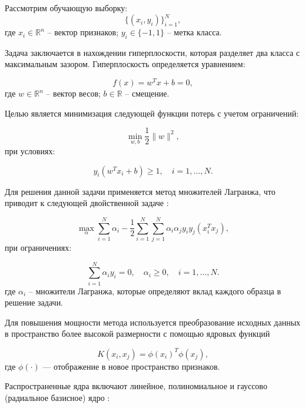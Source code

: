 Рассмотрим обучающую выборку:
\begin{equation*}
    \{(x_i, y_i)\}_{i=1}^N,
\end{equation*}
где $x_i \in \mathbb{R}^n$ -- вектор признаков;
$y_i \in \{-1, 1\}$ -- метка класса.

Задача заключается в нахождении гиперплоскости,
которая разделяет два класса с максимальным зазором. Гиперплоскость определяется уравнением:

\begin{equation*}
    f(x) = w^T x + b = 0,
\end{equation*}
где $w \in \mathbb{R}^n$ -- вектор весов;
$b \in \mathbb{R}$ -- смещение.

Целью является минимизация следующей функции потерь с учетом ограничений:

\begin{equation*}
    \min_{w, b} \frac{1}{2} \|w\|^2,
\end{equation*}
при условиях:

\begin{equation*}
    y_i (w^T x_i + b) \geq 1, \quad i = 1, \ldots, N.
\end{equation*}

Для решения данной задачи применяется метод множителей Лагранжа,
что приводит к следующей двойственной задаче \cite{Patle2013}:

\begin{equation*}
    \max_{\alpha} \sum_{i=1}^N \alpha_i - \frac{1}{2} \sum_{i=1}^N \sum_{j=1}^N \alpha_i \alpha_j y_i y_j (x_i^T x_j),
\end{equation*}
при ограничениях:

\begin{equation*}
    \sum_{i=1}^N \alpha_i y_i = 0, \quad \alpha_i \geq 0, \quad i = 1, \ldots, N.
\end{equation*}
где $\alpha_i$ -- множители Лагранжа, которые определяют вклад каждого образца в решение задачи.

Для повышения мощности метода используется преобразование исходных данных
в пространство более высокой размерности с помощью ядровых
функций

\begin{equation*}
    K(x_i, x_j) = \phi(x_i)^T \phi(x_j),
\end{equation*}
где $\phi(\cdot)$ — отображение в новое
пространство признаков.

Распространенные ядра включают линейное,
полиномиальное и гауссово (радиальное базисное) ядро \cite{Deris2011}:

